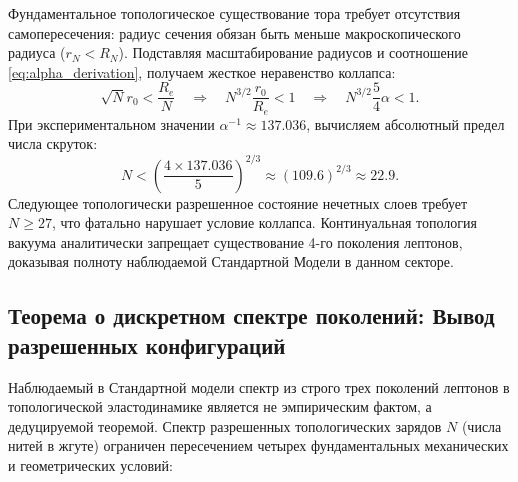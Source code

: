 \documentclass[12pt,a4paper]{article}
\begin{document}
Фундаментальное топологическое существование тора требует отсутствия самопересечения: радиус сечения обязан быть меньше макроскопического радиуса ($r_N < R_N$). Подставляя масштабирование радиусов и соотношение \eqref{eq:alpha_derivation}, получаем жесткое неравенство коллапса:
\begin{equation}
\sqrt{N} r_0 < \frac{R_e}{N} \quad \Longrightarrow \quad N^{3/2} \frac{r_0}{R_e} < 1 \quad \Longrightarrow \quad N^{3/2} \frac{5}{4}\alpha < 1.
\end{equation}
При экспериментальном значении $\alpha^{-1} \approx 137.036$, вычисляем абсолютный предел числа скруток:
\begin{equation}
N < \left( \frac{4 \times 137.036}{5} \right)^{2/3} \approx (109.6)^{2/3} \approx 22.9.
\end{equation}
Следующее топологически разрешенное состояние нечетных слоев требует $N \ge 27$, что фатально нарушает условие коллапса. Континуальная топология вакуума аналитически запрещает существование 4-го поколения лептонов, доказывая полноту наблюдаемой Стандартной Модели в данном секторе.

\subsection{Теорема о дискретном спектре поколений: Вывод разрешенных конфигураций}
Наблюдаемый в Стандартной модели спектр из строго трех поколений лептонов в топологической эластодинамике является не эмпирическим фактом, а дедуцируемой теоремой. Спектр разрешенных топологических зарядов $N$ (числа нитей в жгуте) ограничен пересечением четырех фундаментальных механических и геометрических условий:
\end{document}

